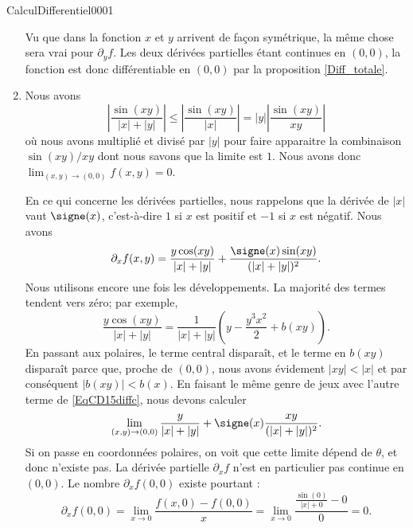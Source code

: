 \begin{corrige}{CalculDifferentiel0001}
\begin{enumerate}
			Vu que dans la fonction $x$ et $y$ arrivent de façon symétrique, la même chose sera vrai pour $\partial_yf$. Les deux dérivées partielles étant continues en $(0,0)$, la fonction est donc différentiable en $(0,0)$ par la proposition \ref{Diff_totale}.


		\item
			Nous avons
			\begin{equation}
				\left| \frac{ \sin(xy) }{ | x |+| y | } \right| \leq\left| \frac{ \sin(xy) }{ | x | } \right| =| y |\left| \frac{ \sin(xy) }{ xy } \right| 
			\end{equation}
			où nous avons multiplié et divisé par $| y |$ pour faire apparaitre la combinaison $\sin(xy)/xy$ dont nous savons que la limite est $1$. Nous avons donc $\lim_{(x,y)\to(0,0)}f(x,y)=0$.

			En ce qui concerne les dérivées partielles, nous rappelons que la dérivée de $| x |$ vaut $\signe(x)$, c'est-à-dire $1$ si $x$ est positif et $-1$ si $x$ est négatif. Nous avons
			\begin{equation}		\label{EqCD15diffc}
				\partial_xf(x,y)=\frac{ y\cos(xy) }{ | x |+| y | }+\frac{ \signe(x)\sin(xy) }{ (| x |+| y |)^2 }.
			\end{equation}
			Nous utilisons encore une fois les développements. La majorité des termes tendent vers zéro; par exemple,
			\begin{equation}
				\frac{ y\cos(xy) }{ | x |+| y | }=\frac{1}{ | x |+| y | }\left( y-\frac{ y^3x^2 }{2}+b(xy) \right).
			\end{equation}
			En passant aux polaires, le terme central disparaît, et le terme en $b(xy)$ disparaît parce que, proche de $(0,0)$, nous avons évidement $|xy|<|x|$ et par conséquent $| b(xy) |<b(x)$. En faisant le même genre de jeux avec l'autre terme de \eqref{EqCD15diffc}, nous devons calculer
			\begin{equation}
				\lim_{(x,y)\to(0,0)}\frac{ y }{ | x |+| y | }+\signe(x)\frac{ xy }{ (| x |+| y |)^2 }.
			\end{equation}
			Si on passe en coordonnées polaires, on voit que cette limite dépend de $\theta$, et donc n'existe pas. La dérivée partielle $\partial_xf$ n'est en particulier pas continue en $(0,0)$. Le nombre $\partial_xf(0,0)$ existe pourtant :
			\begin{equation}
				\partial_xf(0,0)=\lim_{x\to 0} \frac{ f(x,0)-f(0,0) }{ x }=\lim_{x\to 0} \frac{ \frac{ \sin(0) }{ | x |+0 }-0 }{ 0 }=0.
			\end{equation}
			


\end{enumerate}
\end{corrige}
